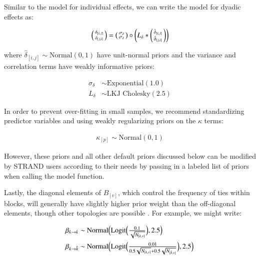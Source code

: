 \documentclass[Afour,sageh,times]{sagej}
\begin{document}
Similar to the model for individual effects, we can write the model for dyadic effects as:
\begin{ceqn}
\begin{equation}
 \begin{psmallmatrix}
\delta_{[i,j]} \\
\delta_{[j,i]}
\end{psmallmatrix}
 =  \begin{psmallmatrix}
\sigma_\delta\\
\sigma_\delta
\end{psmallmatrix} \circ \left(L_\delta*  \begin{psmallmatrix}
\hat\delta_{[i,j]} \\
\hat\delta_{[j,i]}
\end{psmallmatrix}\right)
\end{equation}
\end{ceqn}
where $\hat\delta_{[i,j]}\sim \text {Normal}(0,1)$ have unit-normal priors and the variance and correlation terms have weakly informative priors:

\begin{ceqn}
\begin{align}
\sigma_\delta &\sim \text {Exponential}(1.0)\label{bob89}\\
L_\delta &\sim \text {LKJ Cholesky}(2.5)\label{bob89L}
\end{align}
\end{ceqn}



In order to prevent over-fitting in small samples, we recommend standardizing predictor variables and using weakly regularizing priors on the $\kappa$ terms:
\begin{ceqn}
\begin{align}\label{booyaaaa}
\kappa_{[p]} \sim \text{Normal}(0, 1)
\end{align}
\end{ceqn}

However, these priors and all other default priors discussed below can be modified by STRAND users according to their needs by passing in a labeled list of priors when calling the model function.

Lastly, the diagonal elements of $B_{[v]}$, which control the frequency of ties within blocks, will generally have slightly higher prior weight than the off-diagonal elements, though other topologies are possible \citep[see][]{batagelj1997notes}. For example, we might write:
\begin{ceqn}
\begin{align}
	\beta_{k \to k} &\sim \mathrm{Normal}\Big( \text{Logit}\Big(\tfrac{0.1}{\sqrt{N_{[k,v]}}}\Big) , 2.5 \Big)\label{eq1zz1} \\
	\beta_{k \to \tilde k} &\sim \mathrm{Normal}\Big( \text{Logit}\Big(\tfrac{0.01}{0.5\sqrt{\vphantom{N_{\tilde k}}N_{[k,v]}}+0.5\sqrt{\vphantom{N_{\tilde k}}N_{[\tilde k,v]}}}\Big), 2.5 \Big)\label{eq1zz2}
\end{align}
\end{ceqn}
\end{document}
